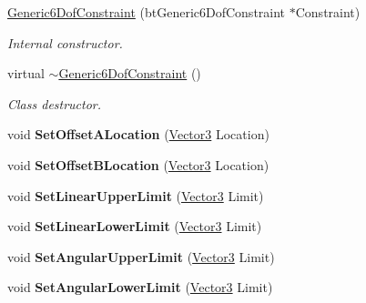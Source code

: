 \begin{DoxyCompactItemize}
\item 
\hyperlink{classphys_1_1Generic6DofConstraint_a7e44417fc8f56eb1770990fa3c3273d3}{Generic6DofConstraint} (btGeneric6DofConstraint $\ast$Constraint)
\begin{DoxyCompactList}\small\item\em Internal constructor. \item\end{DoxyCompactList}\item 
virtual \hyperlink{classphys_1_1Generic6DofConstraint_a0b0bd2e1f1546ed1e6b2ebc2a505a126}{$\sim$Generic6DofConstraint} ()
\begin{DoxyCompactList}\small\item\em Class destructor. \item\end{DoxyCompactList}\item 
\hypertarget{classphys_1_1Generic6DofConstraint_ab3897b43a2b69a91c0b11c112a79d77a}{
void {\bfseries SetOffsetALocation} (\hyperlink{classphys_1_1Vector3}{Vector3} Location)}
\label{de/d2a/classphys_1_1Generic6DofConstraint_ab3897b43a2b69a91c0b11c112a79d77a}

\item 
\hypertarget{classphys_1_1Generic6DofConstraint_ac5bee4672be646dd45274974d10ca57f}{
void {\bfseries SetOffsetBLocation} (\hyperlink{classphys_1_1Vector3}{Vector3} Location)}
\label{de/d2a/classphys_1_1Generic6DofConstraint_ac5bee4672be646dd45274974d10ca57f}

\item 
\hypertarget{classphys_1_1Generic6DofConstraint_ad6b9d20ea5a7808bb16e61e0c3ce2bac}{
void {\bfseries SetLinearUpperLimit} (\hyperlink{classphys_1_1Vector3}{Vector3} Limit)}
\label{de/d2a/classphys_1_1Generic6DofConstraint_ad6b9d20ea5a7808bb16e61e0c3ce2bac}

\item 
\hypertarget{classphys_1_1Generic6DofConstraint_a4481edd145cf461a640e9b930ffd3e98}{
void {\bfseries SetLinearLowerLimit} (\hyperlink{classphys_1_1Vector3}{Vector3} Limit)}
\label{de/d2a/classphys_1_1Generic6DofConstraint_a4481edd145cf461a640e9b930ffd3e98}

\item 
\hypertarget{classphys_1_1Generic6DofConstraint_a2a9aa0e8569335166c1d9d631279e5a4}{
void {\bfseries SetAngularUpperLimit} (\hyperlink{classphys_1_1Vector3}{Vector3} Limit)}
\label{de/d2a/classphys_1_1Generic6DofConstraint_a2a9aa0e8569335166c1d9d631279e5a4}

\item 
\hypertarget{classphys_1_1Generic6DofConstraint_a5c8799086a8cdc4a758ecf2eb6ca2c6c}{
void {\bfseries SetAngularLowerLimit} (\hyperlink{classphys_1_1Vector3}{Vector3} Limit)}
\label{de/d2a/classphys_1_1Generic6DofConstraint_a5c8799086a8cdc4a758ecf2eb6ca2c6c}


\end{DoxyCompactItemize}
